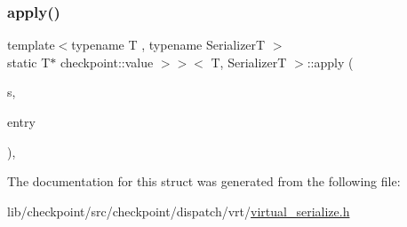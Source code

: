 \subsubsection{\texorpdfstring{apply()}{apply()}}
{\footnotesize\ttfamily template$<$typename T , typename SerializerT $>$ \\
static T$\ast$ checkpoint\+::value $>$$>$$<$ T, SerializerT $>$\+::apply (\begin{DoxyParamCaption}\item[{SerializerT \&}]{s,  }\item[{\hyperlink{namespacecheckpoint_1_1dispatch_1_1vrt_acd3f9e6b091bcfbc23dc35ea8ef45d3b}{dispatch\+::vrt\+::\+Type\+Idx}}]{entry }\end{DoxyParamCaption})\hspace{0.3cm}{\ttfamily [inline]}, {\ttfamily [static]}}



The documentation for this struct was generated from the following file\+:\begin{DoxyCompactItemize}
\item 
lib/checkpoint/src/checkpoint/dispatch/vrt/\hyperlink{virtual__serialize_8h}{virtual\+\_\+serialize.\+h}\end{DoxyCompactItemize}
